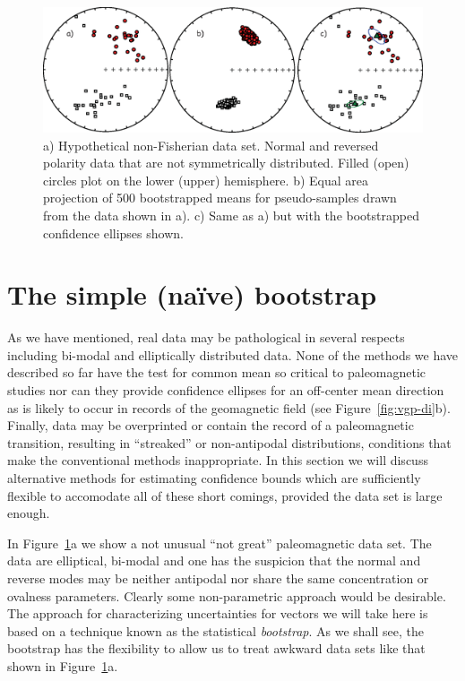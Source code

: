  \begin{figure}[htb]
\centering  \includegraphics[width=14 cm]{EPSfiles/hypeq.eps}
\caption {a) Hypothetical non-Fisherian data set.  Normal and reversed polarity data that are not symmetrically distributed. Filled (open) circles plot on the lower (upper) hemisphere.  b) Equal area projection of 500 bootstrapped means for pseudo-samples drawn from the data shown in    a).    c) Same as a) but with the bootstrapped confidence ellipses shown. }
\label{fig:hypeq}
\end{figure}



\section{The simple (na\"ive) bootstrap}

As we have mentioned,  real data may  be pathological in several respects including  bi-modal and elliptically distributed data.   None of the methods we have described so far  have the  
test for common mean so critical to paleomagnetic studies nor can they provide confidence ellipses for  an off-center mean direction
  as  is likely to occur in records of the geomagnetic field (see Figure~\ref{fig:vgp-di}b).  Finally, data may be overprinted or contain the record of a paleomagnetic transition, resulting in ``streaked'' or non-antipodal distributions, conditions that make the conventional methods inappropriate.    In this section we will discuss alternative methods for estimating confidence bounds which are sufficiently flexible to accomodate all of these short comings, provided the data set is large enough.  

In Figure~\ref{fig:hypeq}a we show a not unusual ``not great'' paleomagnetic data set.  The data are   elliptical, bi-modal and one has the suspicion that the normal and reverse modes may be neither antipodal nor share the same concentration or ovalness parameters.  Clearly some non-parametric approach would be desirable.  
The  approach for   characterizing uncertainties for vectors we will take here is based on a technique known as the statistical 
{\it bootstrap}.  As we shall see, the bootstrap has the flexibility to allow us to treat awkward data sets like that shown in Figure~\ref{fig:hypeq}a.  

